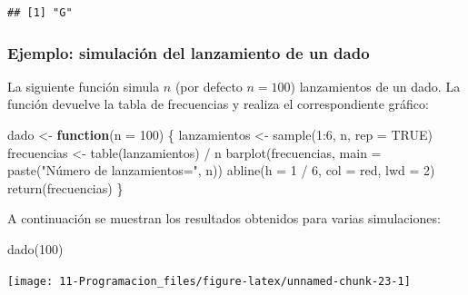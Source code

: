 \documentclass[
]{book}
\newenvironment{Shaded}{\begin{snugshade}}{\end{snugshade}}
\newcommand{\AttributeTok}[1]{\textcolor[rgb]{0.77,0.63,0.00}{#1}}
\newcommand{\ConstantTok}[1]{\textcolor[rgb]{0.00,0.00,0.00}{#1}}
\newcommand{\ControlFlowTok}[1]{\textcolor[rgb]{0.13,0.29,0.53}{\textbf{#1}}}
\newcommand{\DecValTok}[1]{\textcolor[rgb]{0.00,0.00,0.81}{#1}}
\newcommand{\FunctionTok}[1]{\textcolor[rgb]{0.00,0.00,0.00}{#1}}
\newcommand{\NormalTok}[1]{#1}
\newcommand{\OtherTok}[1]{\textcolor[rgb]{0.56,0.35,0.01}{#1}}
\newcommand{\SpecialCharTok}[1]{\textcolor[rgb]{0.00,0.00,0.00}{#1}}
\newcommand{\StringTok}[1]{\textcolor[rgb]{0.31,0.60,0.02}{#1}}
\theoremstyle{break}
\begin{document}
\begin{verbatim}
## [1] "G"
\end{verbatim}

\hypertarget{ejemplo-simulaciuxf3n-del-lanzamiento-de-un-dado}{%
\subsubsection{Ejemplo: simulación del lanzamiento de un dado}\label{ejemplo-simulaciuxf3n-del-lanzamiento-de-un-dado}}

La siguiente función simula \(n\) (por defecto \(n=100\)) lanzamientos de un
dado. La función devuelve la tabla de frecuencias y realiza el
correspondiente gráfico:

\begin{Shaded}
\begin{Highlighting}[]
\NormalTok{dado }\OtherTok{\textless{}{-}} \ControlFlowTok{function}\NormalTok{(}\AttributeTok{n =} \DecValTok{100}\NormalTok{) \{}
\NormalTok{  lanzamientos }\OtherTok{\textless{}{-}} \FunctionTok{sample}\NormalTok{(}\DecValTok{1}\SpecialCharTok{:}\DecValTok{6}\NormalTok{, n, }\AttributeTok{rep =} \ConstantTok{TRUE}\NormalTok{)}
\NormalTok{  frecuencias }\OtherTok{\textless{}{-}} \FunctionTok{table}\NormalTok{(lanzamientos) }\SpecialCharTok{/}\NormalTok{ n}
  \FunctionTok{barplot}\NormalTok{(frecuencias, }\AttributeTok{main =} \FunctionTok{paste}\NormalTok{(}\StringTok{"Número de lanzamientos="}\NormalTok{, n))}
  \FunctionTok{abline}\NormalTok{(}\AttributeTok{h =} \DecValTok{1} \SpecialCharTok{/} \DecValTok{6}\NormalTok{, }\AttributeTok{col =} \StringTok{\textquotesingle{}red\textquotesingle{}}\NormalTok{, }\AttributeTok{lwd =} \DecValTok{2}\NormalTok{)}
  \FunctionTok{return}\NormalTok{(frecuencias)}
\NormalTok{\}}
\end{Highlighting}
\end{Shaded}

A continuación se muestran los resultados obtenidos para
varias simulaciones:

\begin{Shaded}
\begin{Highlighting}[]
\FunctionTok{dado}\NormalTok{(}\DecValTok{100}\NormalTok{)}
\end{Highlighting}
\end{Shaded}

\begin{center}\texttt{[image: 11-Programacion\_files/figure-latex/unnamed-chunk-23-1]} \end{center}
\end{document}
